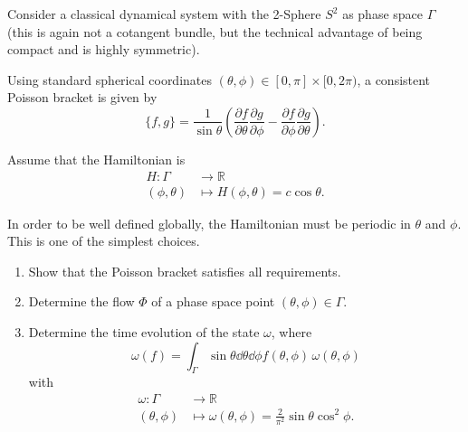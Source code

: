 \begin{Problem}

Consider a classical dynamical system with the 2-Sphere $S^2$ as phase space $\Gamma$ (this is again not a cotangent bundle, but the technical advantage of being compact and is highly symmetric).

Using standard spherical coordinates $(\theta, \phi) \in [0, \pi] \times [0, 2\pi)$, a consistent Poisson bracket is given by
\begin{equation}
	\{f,g\} = \frac{1}{\sin \theta} \left(\frac{\partial f}{\partial \theta} \frac{\partial g}{\partial \phi}- \frac{\partial f}{\partial \phi} \frac{\partial g}{\partial \theta} \right).
\end{equation}

Assume that the Hamiltonian is
\begin{align}
	H : \Gamma &\to \mathbb{R} \nonumber \\
	(\phi, \theta) &\mapsto H(\phi, \theta) = c\cos \theta.
\end{align}

In order to be well defined globally, the Hamiltonian must be periodic in $\theta$ and $\phi$. This is one of the simplest choices.

\begin{enumerate}
	\item Show that the Poisson bracket satisfies all requirements.
	\item Determine the flow $\Phi$ of a phase space point $(\theta, \phi) \in \Gamma$.
	\item Determine the time evolution of the state $\omega$, where
	\begin{equation}
		\omega(f) = \int_{\Gamma}\sin\theta \dd{\theta}\dd{\phi} f(\theta, \phi) \, \omega(\theta, \phi)
	\end{equation}
	with
	\begin{align}
		\omega : \Gamma &\to \mathbb{R}\nonumber\\
		(\theta, \phi) &\mapsto \omega(\theta, \phi) = \frac{2}{\pi^2} \sin \theta \cos^2 \phi.
	\end{align}
\end{enumerate}
\end{Problem}
